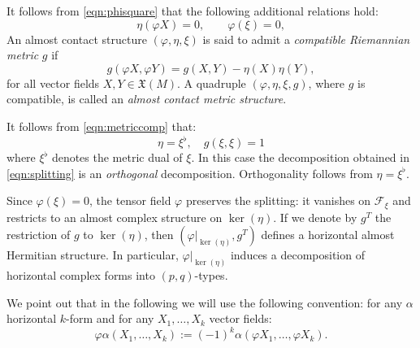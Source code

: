 \documentclass{article}
\theoremstyle{definition}
\renewcommand{\phi}{\varphi}
\numberwithin{equation}{section}
\begin{document}
It follows from \eqref{eqn:phisquare}  that the following additional relations hold:
\begin{equation} \label{eqn:phieta}
    \eta(\phi X) = 0, 
    \qquad 
    \phi(\xi) = 0, 
\end{equation}
An almost contact structure \( (\phi, \eta, \xi) \) is said to admit a \emph{compatible Riemannian metric} \(g\) if
\begin{equation} \label{eqn:metriccomp}
    g(\phi X, \phi Y) = g(X, Y) - \eta(X)\eta(Y),
\end{equation}
for all vector fields \(X, Y \in \mathfrak{X}(M)\).
A quadruple \((\phi, \eta, \xi, g)\), where \(g\) is compatible, is called an \emph{almost contact metric structure}.

It follows from \eqref{eqn:metriccomp} that:
\begin{equation} \label{eqn:phieta2}
    \eta = \xi^\flat, \quad g(\xi,\xi)=1
\end{equation}
where \(\xi^\flat\) denotes the metric dual of \(\xi\). In this case the decomposition obtained in \eqref{eqn:splitting} is an \emph{orthogonal} decomposition. Orthogonality follows from \(\eta = \xi^\flat\).


Since \(\phi(\xi) = 0\), the tensor field \(\phi\) preserves the splitting: it vanishes on \(\mathcal{F}_\xi\) and restricts to an almost complex structure on \(\ker(\eta)\).
If we denote by \(g^T\) the restriction of \(g\) to \(\ker(\eta)\), then 
\((\phi|_{\ker(\eta)}, g^T)\) defines a horizontal almost Hermitian structure. 
In particular, \(\phi|_{\ker(\eta)}\) induces a decomposition of horizontal complex forms into \((p,q)\)-types. \par
We point out that in the following we will use the following convention: for any $\alpha$ horizontal $k$-form and for any $X_1,\dots,X_k$ vector fields:
\[\phi \alpha(X_1,\dots,X_k):=(-1)^k \alpha(\phi X_1,\dots,\phi X_k).\]
\end{document}
